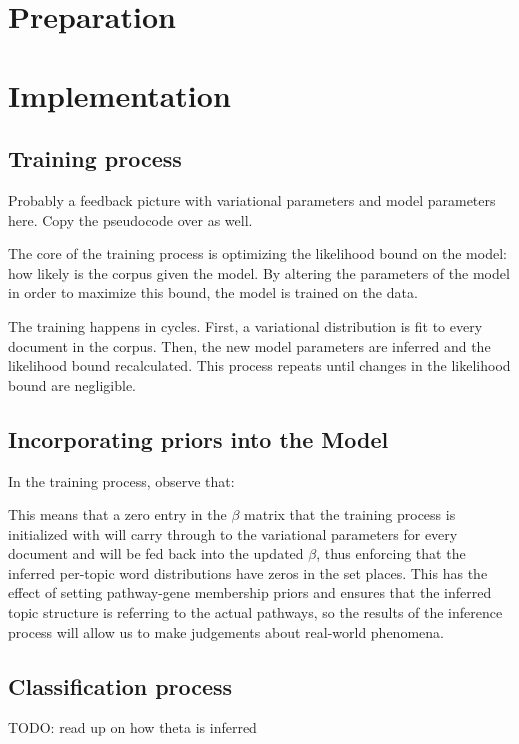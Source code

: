 \documentclass[12pt,a4paper,twoside,openright]{report}
\begin{document}
\chapter{Preparation}

\chapter{Implementation}

\section{Training process}

Probably a feedback picture with variational parameters and model parameters here.
Copy the pseudocode over as well.

The core of the training process is optimizing the likelihood bound on the model: how likely is the corpus given the model. By altering the parameters of the model in order to maximize this bound, the model is trained on the data.

The training happens in cycles. First, a variational distribution is fit to every document in the corpus. Then, the new model parameters are inferred and the likelihood bound recalculated. This process repeats until changes in the likelihood bound are negligible.

\section{Incorporating priors into the Model}

In the training process, observe that:

This means that a zero entry in the $\beta$ matrix that the training process is initialized with will carry through to the variational parameters for every document and will be fed back into the updated $\beta$, thus enforcing that the inferred per-topic word distributions have zeros in the set places. This has the effect of setting pathway-gene membership priors and ensures that the inferred topic structure is referring to the actual pathways, so the results of the inference process will allow us to make judgements about real-world phenomena.

\section{Classification process}

TODO: read up on how theta is inferred
\end{document}

